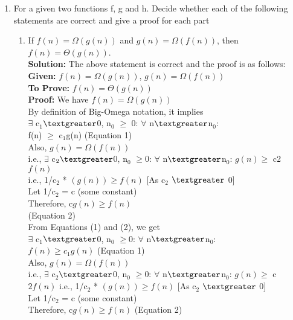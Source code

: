 \documentclass[12pt]{article}
\begin{document}
\begin{enumerate}
\begin{enumerate}
\item {For a given two functions f, g and h. Decide whether each of the following statements
are correct and give a proof for each part}
\indent 
\begin{enumerate}
\item 
{If $f(n) = \Omega(g(n))$ and $g(n) = \Omega(f(n))$, then $f(n) = \Theta(g(n))$.} \\
\textbf{Solution:} The above statement is correct and the proof is as follows:\\            
\textbf{Given:}  $f(n) = \Omega(g(n))$, $g(n) = \Omega(f(n))$     \\       
\textbf{To Prove:} $f(n) = \Theta(g(n))$            \\
\textbf{Proof:} We have $f(n) = \Omega(g(n))$ \\
By definition of Big-Omega notation, it implies\\
$\exists$ c$_{1}$$\textgreater$0, n$_{0}$ $\ge$ 0: $\forall$ n$\textgreater$n$_{0}$:\\  
f(n) $\ge$ c$_{1}$g(n) 
\hfill(Equation 1)\\

Also, $g(n) = \Omega(f(n))$ \\
i.e., $\exists$ c$_{2}\textgreater$0, n$_{0}$ $\ge$0: $\forall$ n$\textgreater$n$_{0}$: $g(n) \ge$ c2$f(n)$  \\            
i.e., 1/c$_{2}$ * $(g(n)) \ge f(n)$ 
\hfill [As c$_{2}$ $\textgreater$ 0]\\                                          
Let 1/c$_{2}$ = c (some constant)\\
Therefore, c$g(n) \ge f(n)$ \\
\hfill (Equation 2)\\              
From Equations (1) and (2), we get \\
$\exists$ c$_{1}$$\textgreater$0, n$_{0}$ $\ge$0: $\forall$ n$\textgreater$n$_{0}$: \\
$f(n) \ge c_{1}g(n)$
\hfill (Equation 1)\\                         

Also, $g(n) = \Omega(f(n))$ \\
i.e., $\exists$ c$_{2}$$\textgreater$0, n$_{0}$ $\ge$0: $\forall$ n$\textgreater$n$_{0}$: $g(n) \ge$ c$2f(n)$              
i.e., 1/c$_{2}$ * $(g(n)) \ge f(n)$
\hfill [As c$_{2}$ $\textgreater$ 0]\\                                         
Let 1/c$_{2}$ = c (some constant) \\
Therefore, c$g(n) \ge f(n)$
\hfill (Equation 2)\\


\end{enumerate}
\end{enumerate}
\end{enumerate}
\end{document}
